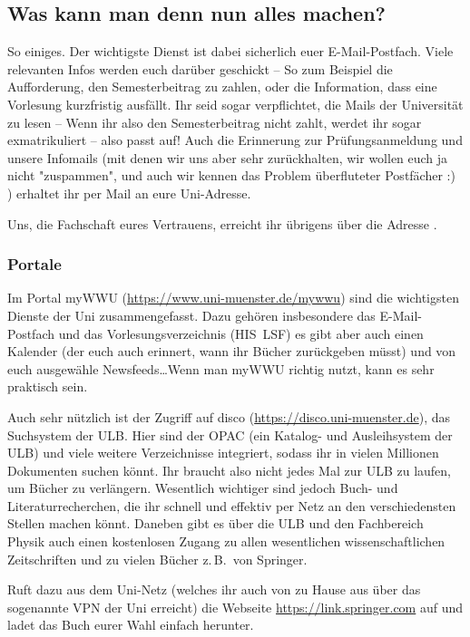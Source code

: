 \begin{multicols*}{2}
\subsection{Was kann man denn nun alles machen?}
So einiges. Der wichtigste Dienst ist dabei sicherlich euer E-Mail-Postfach.
Viele relevanten Infos werden euch darüber geschickt -- So zum Beispiel die Aufforderung, den Semesterbeitrag zu zahlen, oder die Information, dass eine Vorlesung kurzfristig ausfällt.
Ihr seid sogar verpflichtet, die Mails der Universität zu lesen -- Wenn ihr also den Semesterbeitrag nicht zahlt, werdet ihr sogar exmatrikuliert -- also passt auf! Auch die Erinnerung zur Prüfungsanmeldung und unsere Infomails (mit denen wir uns aber sehr zurückhalten, wir wollen euch ja nicht "zuspammen", und auch wir kennen das Problem überfluteter Postfächer :) ) erhaltet ihr per Mail an eure Uni-Adresse.

Uns, die Fachschaft eures Vertrauens, erreicht ihr übrigens über die Adresse .

\subsubsection{Portale}
Im Portal myWWU (\url{https://www.uni-muenster.de/mywwu}) sind die wichtigsten Dienste der Uni zusammengefasst.
Dazu gehören insbesondere das E-Mail-Postfach und das Vorlesungsverzeichnis (HIS~LSF) es gibt aber auch einen Kalender (der euch auch erinnert, wann ihr Bücher zurückgeben müsst) und von euch ausgewähle Newsfeeds\dots Wenn man myWWU richtig nutzt, kann es sehr praktisch sein.

Auch sehr nützlich ist der Zugriff auf disco (\url{https://disco.uni-muenster.de}), das Suchsystem der ULB.
Hier sind der OPAC (ein Katalog- und Ausleihsystem der ULB) und viele weitere Verzeichnisse integriert, sodass ihr in vielen Millionen Dokumenten suchen könnt.
Ihr braucht also nicht jedes Mal zur ULB zu laufen, um Bücher zu verlängern.
Wesentlich wichtiger sind jedoch Buch- und Literaturrecherchen, die ihr schnell und effektiv per Netz an den verschiedensten Stellen machen könnt.
Daneben gibt es über die ULB und den Fachbereich Physik auch einen kostenlosen Zugang zu allen wesentlichen wissenschaftlichen Zeitschriften und zu vielen Bücher z.\,B.\ von Springer.

Ruft dazu aus dem Uni-Netz (welches ihr auch von zu Hause aus über das sogenannte VPN der Uni erreicht) die Webseite \url{https://link.springer.com} auf und ladet das Buch eurer Wahl einfach herunter.


\end{multicols*}
